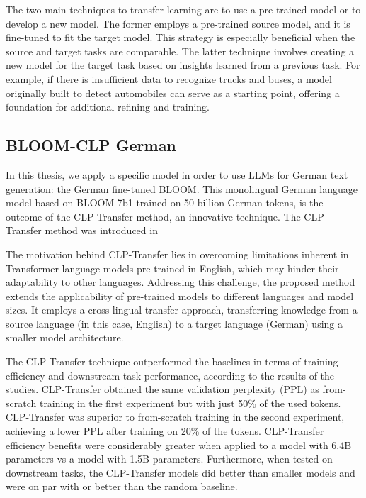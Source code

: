 The two main techniques to transfer learning are to use a pre-trained model or to develop a new model. The former employs a pre-trained source model, and it is fine-tuned to fit the target model. This strategy is especially beneficial when the source and target tasks are comparable. The latter technique involves creating a new model for the target task based on insights learned from a previous task. For example, if there is insufficient data to recognize trucks and buses, a model originally built to detect automobiles can serve as a starting point, offering a foundation for additional refining and training.\cite{alyafeai2020survey}

\subsection{BLOOM-CLP German}\label{german-bloom}

In this thesis, we apply a specific model in order to use LLMs for German text generation: the German fine-tuned BLOOM. This monolingual German language model based on BLOOM-7b1 trained on 50 billion German tokens, is the outcome of the CLP-Transfer method, an innovative technique. The CLP-Transfer method was introduced in \cite{Ostendorff2023clp}

The motivation behind CLP-Transfer lies in overcoming limitations inherent in Transformer language models pre-trained in English, which may hinder their adaptability to other languages. Addressing this challenge, the proposed method extends the applicability of pre-trained models to different languages and model sizes. It employs a cross-lingual transfer approach, transferring knowledge from a source language (in this case, English) to a target language (German) using a smaller model architecture.

The CLP-Transfer technique outperformed the baselines in terms of training efficiency and downstream task performance, according to the results of the studies. CLP-Transfer obtained the same validation perplexity (PPL) as from-scratch training in the first experiment but with just 50\% of the used tokens. CLP-Transfer was superior to from-scratch training in the second experiment, achieving a lower PPL after training on 20\% of the tokens. CLP-Transfer efficiency benefits were considerably greater when applied to a model with 6.4B parameters vs a model with 1.5B parameters. Furthermore, when tested on downstream tasks, the CLP-Transfer models did better than smaller models and were on par with or better than the random baseline.


